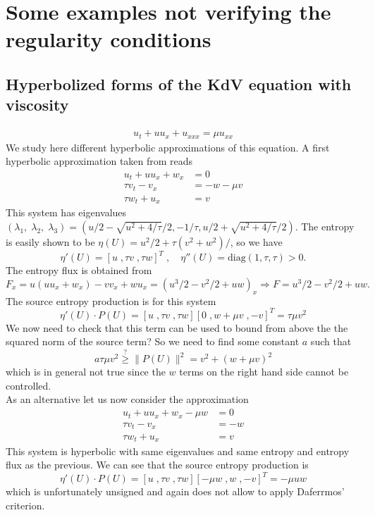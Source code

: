\documentclass{article}
\theoremstyle{plain}
\theoremstyle{definition}
\numberwithin{theorem}{section}
\begin{document}
\section{Some examples not verifying the regularity conditions}

\subsection{Hyperbolized forms of the KdV equation with viscosity}

\begin{align}
    u_t + u u_x + u_{xxx} = \mu u_{xx}
\end{align}
We study here different hyperbolic approximations of this equation. 
A first  hyperbolic approximation taken from \cite{giesselmann2025convergence} reads  
\begin{subequations} \label{vkdvh1}
\begin{align}
    u_t + u u_x  + w_x & = 0 \\
    \tau v_t   - v_x  & = -w -\mu v\\
        \tau w_t +  u_x & = v
\end{align}
\end{subequations}
This system has eigenvalues $(\lambda_1,\; \lambda_2,\;\lambda_3)=(u/2 - \sqrt{u^2+4/\tau}/2, -1/\tau, u/2+ \sqrt{u^2+4/\tau}/2)$.
The entropy is easily shown to be $\eta(U) = u^2/2 + \tau (v^2+w^2)/$, so we have 
$$
\eta'(U)= [u\;, \tau v\;, \tau w]^T\;,\quad 
\eta''(U) =  \text{diag}(1,\tau,\tau) >0.
$$
The entropy flux is obtained from
$$
F_x =u (u u_x  + w_x) - v v_x + wu_x = ( u^3/2 - v^2/2  + uw )_x\Rightarrow F = u^3/2 - v^2/2  + uw.
$$
The source entropy production is for this system
$$
\eta'(U)\cdot P(U) = [u\;, \tau v\;, \tau w] [0\;, w +\mu v\;, -v]^T = \tau \mu v^2  
$$
We now need to check that this term can be used to bound from above the the squared norm of the source term?
So we need to find some constant $a$ such that  
$$
  a \tau \mu   v^2 \stackrel{?}{\ge} \|P(U)\|^2 = v^2 + (w +\mu v)^2 
$$
which is in general not true since the $w$ terms on the right hand side cannot be controlled.\\



As an alternative let us now consider the approximation
\begin{subequations} \label{vkdvh2}
\begin{align}
    u_t + u u_x  + w_x -\mu w & = 0 \\
    \tau v_t - v_x & = -w\\
        \tau w_t +  u_x & = v
\end{align}
\end{subequations} 
This system is hyperbolic with  same eigenvalues  and same entropy and entropy flux as the previous. 
We can see that  the source entropy production is
$$
\eta'(U)\cdot P(U) = [u\;, \tau v\;, \tau w] [-\mu w\;, w\;, -v]^T =- \mu u w
$$
which is unfortunately unsigned and again does not allow to apply Daferrmos' criterion.\\
\end{document}
